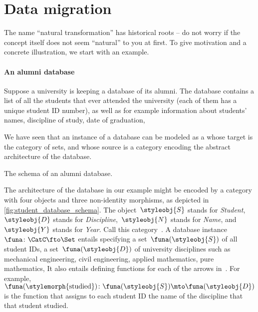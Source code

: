 
\section{Data migration}

The name ``natural transformation'' has historical roots -- do not worry if the concept itself does not seem ``natural'' to you at first.
To give motivation and a concrete illustration, we start with an example.

\paragraph{An alumni database}

Suppose a university is keeping a database of its alumni.
The database contains a list of all the students that ever attended the university (each of them has a unique student ID number), as well as for example information about students' names, discipline of study, date of graduation, \etc

We have seen that an instance of a database can be modeled as a  whose target is the category of sets, and whose source is a category encoding the abstract architecture of the database.

%
\begin{marginfigure}
    \centering
    \caption{The schema of an alumni database.}
    \label{fig:student_database_schema}
\end{marginfigure}
%

The architecture of the database in our example might be encoded by a category with four objects and three non-identity morphisms, as depicted in \cref{fig:student_database_schema}.
The object~$\styleobj{S}$ stands for \emph{Student},~$\styleobj{D}$ stands for \emph{Discipline},~$\styleobj{N}$ stands for \emph{Name}, and~$\styleobj{Y}$ stands for \emph{Year}.
Call this category~\CatC.
A database instance~$\funa \colon \CatC \fto \Set$ entails specifying a set~$\funa(\styleobj{S})$ of all student IDs, a set~$\funa(\styleobj{D})$ of university disciplines such as mechanical engineering, civil engineering, applied mathematics, pure mathematics, \etc
It also entails defining functions for each of the arrows in~\CatC.
For example,~$\funa(\stylemorph{\text{studied}}) \colon \funa(\styleobj{S}) \mto \funa(\styleobj{D})$ is the function that assigns to each student ID the name of the discipline that that student studied.


